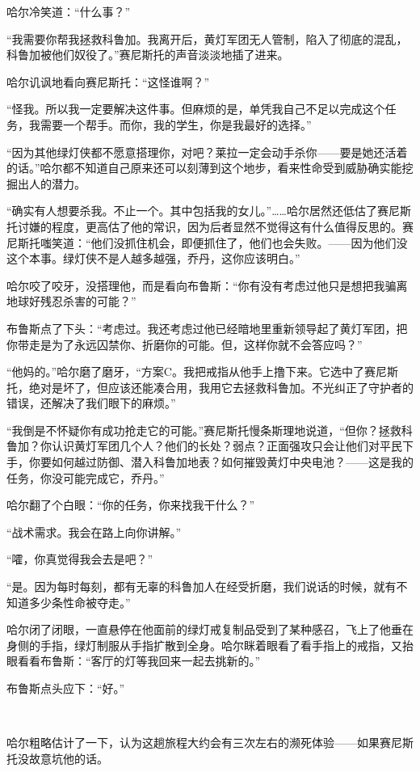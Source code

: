 \documentclass[../main]{subfiles}
\begin{document}
哈尔冷笑道：“什么事？”

“我需要你帮我拯救科鲁加。我离开后，黄灯军团无人管制，陷入了彻底的混乱，科鲁加被他们奴役了。”赛尼斯托的声音淡淡地插了进来。

哈尔讥讽地看向赛尼斯托：“这怪谁啊？”

“怪我。所以我一定要解决这件事。但麻烦的是，单凭我自己不足以完成这个任务，我需要一个帮手。而你，我的学生，你是我最好的选择。”

“因为其他绿灯侠都不愿意搭理你，对吧？莱拉一定会动手杀你——要是她还活着的话。”哈尔都不知道自己原来还可以刻薄到这个地步，看来性命受到威胁确实能挖掘出人的潜力。

“确实有人想要杀我。不止一个。其中包括我的女儿。”……哈尔居然还低估了赛尼斯托讨嫌的程度，更高估了他的常识，因为后者显然不觉得这有什么值得反思的。赛尼斯托嗤笑道：“他们没抓住机会，即便抓住了，他们也会失败。——因为他们没这个本事。绿灯侠不是人越多越强，乔丹，这你应该明白。”

哈尔咬了咬牙，没搭理他，而是看向布鲁斯：“你有没有考虑过他只是想把我骗离地球好残忍杀害的可能？”

布鲁斯点了下头：“考虑过。我还考虑过他已经暗地里重新领导起了黄灯军团，把你带走是为了永远囚禁你、折磨你的可能。但，这样你就不会答应吗？”

“他妈的。”哈尔磨了磨牙，“方案C。我把戒指从他手上撸下来。它选中了赛尼斯托，绝对是坏了，但应该还能凑合用，我用它去拯救科鲁加。不光纠正了守护者的错误，还解决了我们眼下的麻烦。”

“我倒是不怀疑你有成功抢走它的可能。”赛尼斯托慢条斯理地说道，“但你？拯救科鲁加？你认识黄灯军团几个人？他们的长处？弱点？正面强攻只会让他们对平民下手，你要如何越过防御、潜入科鲁加地表？如何摧毁黄灯中央电池？——这是我的任务，你没可能完成它，乔丹。”

哈尔翻了个白眼：“你的任务，你来找我干什么？”

“战术需求。我会在路上向你讲解。”

“嚯，你真觉得我会去是吧？”

“是。因为每时每刻，都有无辜的科鲁加人在经受折磨，我们说话的时候，就有不知道多少条性命被夺走。”

哈尔闭了闭眼，一直悬停在他面前的绿灯戒复制品受到了某种感召，飞上了他垂在身侧的手指，绿灯制服从手指扩散到全身。哈尔眯着眼看了看手指上的戒指，又抬眼看看布鲁斯：“客厅的灯等我回来一起去挑新的。”

布鲁斯点头应下：“好。”

~\

哈尔粗略估计了一下，认为这趟旅程大约会有三次左右的濒死体验——如果赛尼斯托没故意坑他的话。
\end{document}
